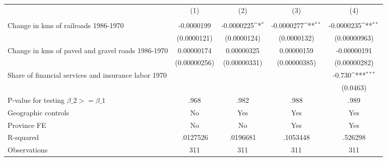 {
\def\sym#1{\ifmmode^{#1}\else\(^{#1}\)\fi}
\begin{tabular}{l*{4}{c}}
\hline\hline
                &\multicolumn{1}{c}{(1)}&\multicolumn{1}{c}{(2)}&\multicolumn{1}{c}{(3)}&\multicolumn{1}{c}{(4)}\\
                &\multicolumn{1}{c}{}&\multicolumn{1}{c}{}&\multicolumn{1}{c}{}&\multicolumn{1}{c}{}\\
\hline
Change in kms of railroads 1986-1970&-0.0000199         &-0.0000225\sym{*}  &-0.0000277\sym{**} &-0.0000235\sym{**} \\
                &(0.0000121)         &(0.0000124)         &(0.0000132)         &(0.00000963)         \\
[1em]
Change in kms of paved and gravel roads 1986-1970&0.00000174         &0.00000325         &0.00000159         &-0.00000191         \\
                &(0.00000256)         &(0.00000331)         &(0.00000385)         &(0.00000282)         \\
[1em]
Share of financial services and insurance labor 1970&                  &                  &                  &   -0.730\sym{***}\\
                &                  &                  &                  & (0.0463)         \\
\hline
P-value for testing $\beta\_{2} >= \beta\_{1}$&     .968         &     .982         &     .988         &     .989         \\
Geographic controls&       No         &      Yes         &      Yes         &      Yes         \\
Province FE     &       No         &       No         &      Yes         &      Yes         \\
R-squared       & .0127526         & .0196681         & .1053448         &  .526298         \\
Observations    &      311         &      311         &      311         &      311         \\
\hline\hline
\end{tabular}
}
